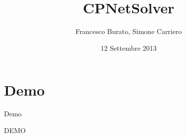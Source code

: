 \documentclass[xcolor=dvipsnames]{beamer}
\title{CPNetSolver}
\author{Francesco Burato, Simone Carriero}
\institute[UNIPD]{
  Dipartimento di Matematica\\
  Università degli Studi di Padova\\[1ex]
}
\date{12 Settembre 2013}
\begin{document}
\begin{frame}[plain]
  \titlepage
\end{frame}







\section{Demo}
\begin{frame}{Demo}
\begin{center}
\Huge DEMO
\end{center}
\end{frame}
\end{document}
